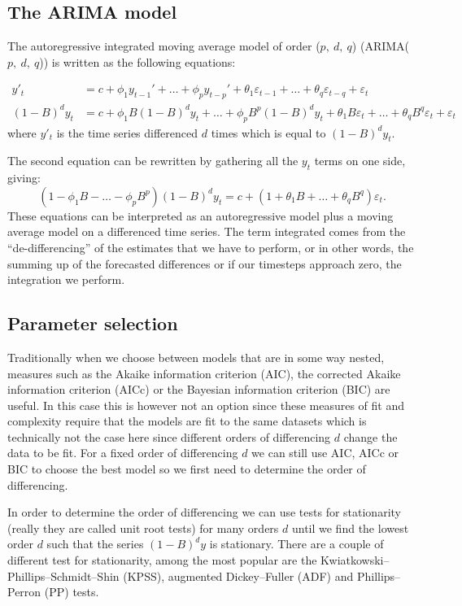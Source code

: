 \documentclass[a4paper, 12pt]{scrartcl}
\begin{document}
\subsection{The ARIMA model}
The autoregressive integrated moving average model of order ($p,~d,~q$) (ARIMA($p,~d,~q$)) is written as the following equations:

\begin{align*}
	y'_t&=c+\phi_1y_{t-1}'+\dots+\phi_py_{t-p}'+\theta_1\varepsilon_{t-1}+\dots+\theta_q\varepsilon_{t-q}+\varepsilon_t\\
	(1-B)^dy_{t}&=c+\phi_1B(1-B)^dy_{t}+\dots+\phi_pB^p(1-B)^dy_t+\theta_1B\varepsilon_t+\dots+\theta_qB^q\varepsilon_{t}+\varepsilon_t
\end{align*}
where $y'_t$ is the time series differenced $d$ times which is equal to $(1-B)^dy_{t}$.

The second equation can be rewritten by gathering all the $y_t$ terms on one side, giving:
\begin{equation*}
	\left(1-\phi_1B-\dots-\phi_pB^p\right)\left(1-B\right)^dy_t=c+\left(1+\theta_1B+\dots+\theta_qB^q\right)\varepsilon_{t}.
\end{equation*}
These equations can be interpreted as an autoregressive model plus a moving average model on a differenced time series.
The term integrated comes from the ``de-differencing'' of the estimates that we have to perform, or in other words, the summing up of the forecasted differences or if our timesteps approach zero, the integration we perform.

\subsection{Parameter selection}

Traditionally when we choose between models that are in some way nested, measures such as the Akaike information criterion (AIC), the corrected Akaike information criterion (AICc) or the Bayesian information criterion (BIC) are useful.
In this case this is however not an option since these measures of fit and complexity require that the models are fit to the same datasets which is technically not the case here since different orders of differencing $d$ change the data to be fit.
For a fixed order of differencing $d$ we can still use AIC, AICc or BIC to choose the best model so we first need to determine the order of differencing.

In order to determine the order of differencing we can use tests for stationarity (really they are called unit root tests) for many orders $d$ until we find the lowest order $d$ such that the series $(1-B)^dy$ is stationary.
There are a couple of different test for stationarity, among the most popular are the Kwiatkowski–Phillips–Schmidt–Shin (KPSS), augmented Dickey–Fuller (ADF) and Phillips–Perron (PP) tests.
\end{document}
